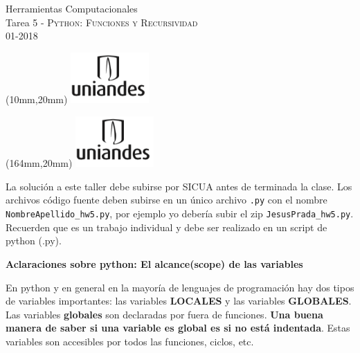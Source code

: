 \documentclass[11pt,letterpaper]{exam}
\begin{document}
\begin{center}
{\Large Herramientas Computacionales} \\
Tarea 5 - \textsc{Python: Funciones y Recursividad}\\
01-2018\\
\end{center}

\begin{textblock*}{40mm}(10mm,20mm)
  \includegraphics[width=3cm]{logoUniandes}
\end{textblock*}

\begin{textblock*}{40mm}(164mm,20mm)
  \includegraphics[width=3cm]{logoUniandes}
\end{textblock*}

\vspace{0.3cm}

\noindent
La soluci\'on a este taller debe subirse por SICUA antes de terminada la clase.
\noindent
Los archivos c\'odigo fuente deben subirse en un \'unico archivo
\verb".py" con el nombre \verb"NombreApellido_hw5.py", por ejemplo
yo deber\'ia subir el zip \verb"JesusPrada_hw5.py". Recuerden que es un trabajo individual y debe ser realizado en un script de python (.py).

\vspace{0.3cm}

\LARGE \textbf{Aclaraciones sobre python: El alcance(scope) de las variables}\\

\normalsize

En python y en general en la mayor\'ia de lenguajes de programaci\'on hay dos tipos de variables importantes: las variables \textbf{LOCALES} y las variables \textbf{GLOBALES}.\\

Las variables \textbf{globales} son declaradas por fuera de funciones. \textbf{Una buena manera de saber si una variable es global es si no est\'a indentada}. Estas variables son accesibles por todos las funciones, ciclos, etc.\\
\end{document}
